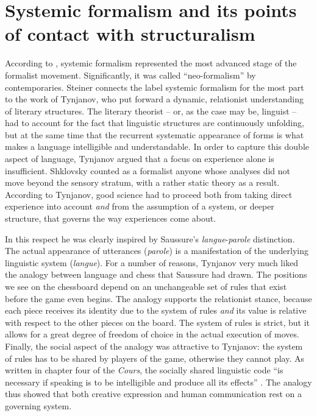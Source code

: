 \documentclass[output=paper]{langscibook}
\begin{document}
\section{Systemic formalism and its points of contact with structuralism}
\label{sec:karstens:systemicformalism}

According to \citet[112]{Steiner1984}, systemic formalism represented the most advanced stage of the formalist movement. Significantly, it was called ``neo-formalism'' by contemporaries. Steiner connects the label systemic formalism for the most part to the work of Tynjanov, who put forward a dynamic, relationist understanding of literary structures. The literary theorist -- or, as the case may be, linguist -- had to account for the fact that linguistic structures are continuously unfolding, but at the same time that the recurrent systematic appearance of forms is what makes a language intelligible and understandable. In order to capture this double aspect of language, Tynjanov argued that a focus on experience alone is insufficient. Shklovsky counted as a formalist anyone whose analyses did not move beyond the sensory stratum, with a rather static theory as a result. According to Tynjanov, good science had to proceed both from taking direct experience into account \emph{and} from the assumption of a system, or deeper structure, that governs the way experiences come about. 

In this respect he was clearly inspired by Saussure's \emph{langue}-\emph{parole} distinction. The actual appearance of utterances (\emph{parole}) is a manifestation of the underlying linguistic system (\emph{langue}). For a number of reasons, Tynjanov very much liked the analogy between language and chess that Saussure had drawn. The positions we see on the chessboard depend on an unchangeable set of rules that exist before the game even begins. The analogy supports the relationist stance, because each piece receives its identity due to the system of rules \emph{and} its value is relative with respect to the other pieces on the board. The system of rules is strict, but it allows for a great degree of freedom of choice in the actual execution of moves. Finally, the social aspect of the analogy was attractive to Tynjanov: the system of rules has to be shared by players of the game, otherwise they cannot play. As written in chapter four of the \emph{Cours}, the socially shared linguistic code ``is necessary if speaking is to be intelligible and produce all its effects'' \citep[37]{Saussure19221916}. The analogy thus showed that both creative expression and human communication rest on a governing system.
\end{document}
